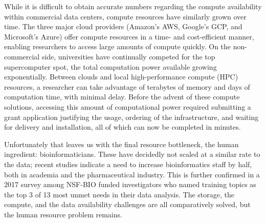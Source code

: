 
While it is difficult to obtain accurate numbers regarding the compute availability within commercial data centers, compute resources have similarly grown over time.
The three major cloud providers (Amazon's AWS, Google's GCP, and Microsoft's Azure) offer compute resources in a time- and cost-efficient manner, enabling researchers to access large amounts of compute quickly\cite{Dudley_2010}.
On the non-commercial side, universities have continually competed for the top supercomputer spot, the total computation power available growing exponentially\cite{Dallaire_1984,Meuer_2013}.
Between clouds and local high-performance compute (HPC) resources, a researcher can take advantage of terabytes of memory and days of computation time, with minimal delay.
Before the advent of these compute solutions, accessing this amount of computational power required submitting a grant application justifying the usage, ordering of the infrastructure, and waiting for delivery and installation, all of which can now be completed in minutes.

Unfortunately that leaves us with the final resource bottleneck, the human ingredient: bioinformaticians.
These have decidedly not scaled at a similar rate to the data; recent studies indicate a need to increase bioinformatics staff by half, both in academia and the pharmaceutical industry\cite{Attwood_2017}. %
This is further confirmed in a 2017 survey among NSF-BIO funded investigators who named training topics as the top 3 of 13 most unmet needs in their data analysis\cite{Barone2017}.
The storage, the compute, and the data availability challenges are all comparatively solved, but the human resource problem remains.

